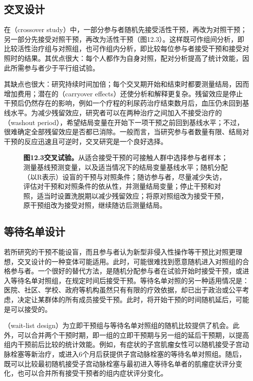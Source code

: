 \subsection{交叉设计}
在（crossover study）中，一部分参与者随机先接受活性干预，再改为对照干预；另一部分先接受对照干预，再改为活性干预（图12.3）。这样既可作组间分析，即比较活性治疗组与对照组，也可作组内分析，即比较每位参与者接受干预和接受对照时的结果。其优点很大：每个人都作为自身对照，配对分析提高了统计效能，因此所需参与者少于平行组试验。

其缺点也很大：研究持续时间加倍；每个交叉期开始和结束时都要测量结局，因而增加费用；潜在的（carryover effects）还使分析和解释更复杂。残留效应是停止干预后仍然存在的影响，例如一个疗程的利尿药治疗结束数月后，血压仍未回到基线水平。为减少残留效应，研究者可以在两种治疗之间加入不接受治疗的（washout period），希望结局变量在开始下一项干预之前回到基线水平；不过，很难确定全部残留效应是否都已消除。一般而言，当研究参与者数量有限、结局对干预的反应迅速且可逆时，交叉研究是一个良好选择。
\begin{figure}[htbp]\centering\chTwelveCrossover
\caption*{\textbf{图12.3\quad 交叉试验。}从适合接受干预的可接触人群中选择参与者样本；测量基线预测变量，以及适当情况下的结局变量基线水平；随机分配（以R表示）设盲的干预与对照条件；随访参与者，尽量减少失访，评估对干预和对照条件的依从性，并测量结局变量；停止干预和对照，适当时设置洗脱期以减少残留效应；将原对照组改为接受干预，原干预组改为接受对照，继续随访后测量结局。}
\end{figure}

\subsection{等待名单设计}
若所研究的干预不能设盲，而且参与者认为新型非侵入性操作等干预比对照更理想，交叉设计的一种变体可能适用。此时，可能很难找到愿意随机进入对照组的合格参与者。一个很好的替代方法，是随机分配参与者在试验开始时接受干预，或进入等待名单对照组，在规定时间后接受干预。等待名单对照的另一种适用情况是：医院、社区、学校、政府等机构虽然只有有限的疗效依据，却已出于政治或公平考虑，决定让某群体的所有成员接受干预。此时，将开始干预的时间随机延后，可能是可以接受的。

（wait-list design）为立即干预组与等待名单对照组的随机比较提供了机会。此外，可以合并两个干预时期，即一组的立即干预期与另一组的延后干预期，以提高组内干预前后比较的统计效能。例如，有症状的子宫肌瘤女性可以随机接受子宫动脉栓塞等新治疗，或进入6个月后获提供子宫动脉栓塞的等待名单对照组。随后，既可以比较最初随机接受子宫动脉栓塞与最初进入等待名单者的肌瘤症状评分变化，也可以合并所有接受干预者的组内症状评分变化。

